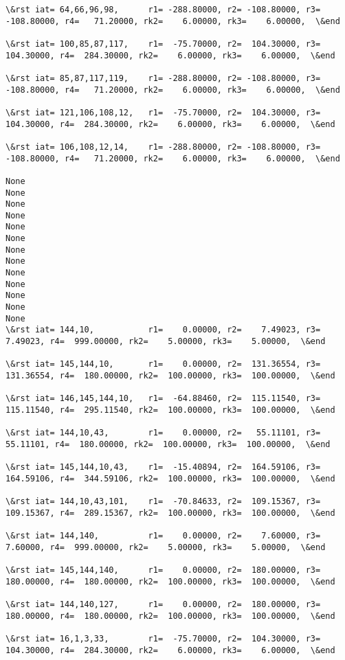 \documentclass[11pt]{article}
\begin{document}
\begin{Verbatim}[commandchars=\\\{\}]
\&rst iat= 64,66,96,98,      r1= -288.80000, r2= -108.80000, r3= -108.80000, r4=   71.20000, rk2=    6.00000, rk3=    6.00000,  \&end

\&rst iat= 100,85,87,117,    r1=  -75.70000, r2=  104.30000, r3=  104.30000, r4=  284.30000, rk2=    6.00000, rk3=    6.00000,  \&end

\&rst iat= 85,87,117,119,    r1= -288.80000, r2= -108.80000, r3= -108.80000, r4=   71.20000, rk2=    6.00000, rk3=    6.00000,  \&end

\&rst iat= 121,106,108,12,   r1=  -75.70000, r2=  104.30000, r3=  104.30000, r4=  284.30000, rk2=    6.00000, rk3=    6.00000,  \&end

\&rst iat= 106,108,12,14,    r1= -288.80000, r2= -108.80000, r3= -108.80000, r4=   71.20000, rk2=    6.00000, rk3=    6.00000,  \&end

None
None
None
None
None
None
None
None
None
None
None
None
None
\&rst iat= 144,10,           r1=    0.00000, r2=    7.49023, r3=    7.49023, r4=  999.00000, rk2=    5.00000, rk3=    5.00000,  \&end

\&rst iat= 145,144,10,       r1=    0.00000, r2=  131.36554, r3=  131.36554, r4=  180.00000, rk2=  100.00000, rk3=  100.00000,  \&end

\&rst iat= 146,145,144,10,   r1=  -64.88460, r2=  115.11540, r3=  115.11540, r4=  295.11540, rk2=  100.00000, rk3=  100.00000,  \&end

\&rst iat= 144,10,43,        r1=    0.00000, r2=   55.11101, r3=   55.11101, r4=  180.00000, rk2=  100.00000, rk3=  100.00000,  \&end

\&rst iat= 145,144,10,43,    r1=  -15.40894, r2=  164.59106, r3=  164.59106, r4=  344.59106, rk2=  100.00000, rk3=  100.00000,  \&end

\&rst iat= 144,10,43,101,    r1=  -70.84633, r2=  109.15367, r3=  109.15367, r4=  289.15367, rk2=  100.00000, rk3=  100.00000,  \&end

\&rst iat= 144,140,          r1=    0.00000, r2=    7.60000, r3=    7.60000, r4=  999.00000, rk2=    5.00000, rk3=    5.00000,  \&end

\&rst iat= 145,144,140,      r1=    0.00000, r2=  180.00000, r3=  180.00000, r4=  180.00000, rk2=  100.00000, rk3=  100.00000,  \&end

\&rst iat= 144,140,127,      r1=    0.00000, r2=  180.00000, r3=  180.00000, r4=  180.00000, rk2=  100.00000, rk3=  100.00000,  \&end

\&rst iat= 16,1,3,33,        r1=  -75.70000, r2=  104.30000, r3=  104.30000, r4=  284.30000, rk2=    6.00000, rk3=    6.00000,  \&end


\end{Verbatim}
\end{document}

